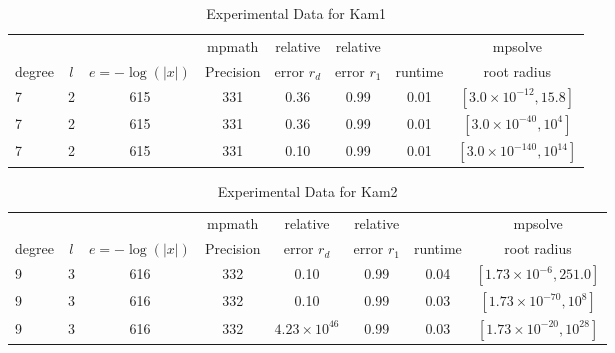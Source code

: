 \documentclass[sigconf]{acmart}
\begin{document}
\begin{table}[t]
\caption{Experimental Data for Kam1}
\label{tab:kam1}
\vskip -0.15in
\begin{center}
\begin{small}
\begin{sc}
\begin{tabular}{lccccccc}
\toprule
&  &  & mpmath & relative  & relative &  & mpsolve \\
degree  & $l$& $e=-\log(|x|)$& Precision &error $r_d$       & error $r_1$ &runtime& root radius\\
\midrule
   7 & 2 & 615 & 331 & 0.36 & 0.99 & 0.01 & $[3.0 \times 10^{-12}, 15.8]$ \\
   7 & 2 & 615 & 331 & 0.36 & 0.99 & 0.01 & $[3.0 \times 10^{-40}, 10^4]$\\
   7 & 2 & 615 & 331 & 0.10 & 0.99 & 0.01 & $[3.0 \times 10^{-140}, 10^{14}]$\\
\bottomrule
\end{tabular}
\end{sc}
\end{small}
\end{center}
\vskip 0.05in
\end{table}

\begin{table}[t]
\caption{Experimental Data for Kam2}
\label{tab:kam2}
\vskip -0.15in
\begin{center}
\begin{small}
\begin{sc}
\begin{tabular}{lccccccc}
\toprule
&  &  & mpmath & relative  & relative &  & mpsolve \\
degree  & $l$& $e=-\log(|x|)$& Precision &error $r_d$       & error $r_1$ &runtime& root radius\\
\midrule
   9 & 3 & 616 & 332 & 0.10 & 0.99 & 0.04 & $[1.73 \times 10^{-6},251.0]$ \\
   9 & 3 & 616 & 332 & 0.10 & 0.99 & 0.03 & $[1.73 \times 10^{-70},10^{8}]$\\
   9 & 3 & 616 & 332 & $4.23 \times 10^{46}$ & 0.99 & 0.03 & $[1.73 \times 10^{-20},10^{28}]$\\ %
\bottomrule
\end{tabular}
\end{sc}
\end{small}
\end{center}
\vskip 0.05in
\end{table}
\end{document}
